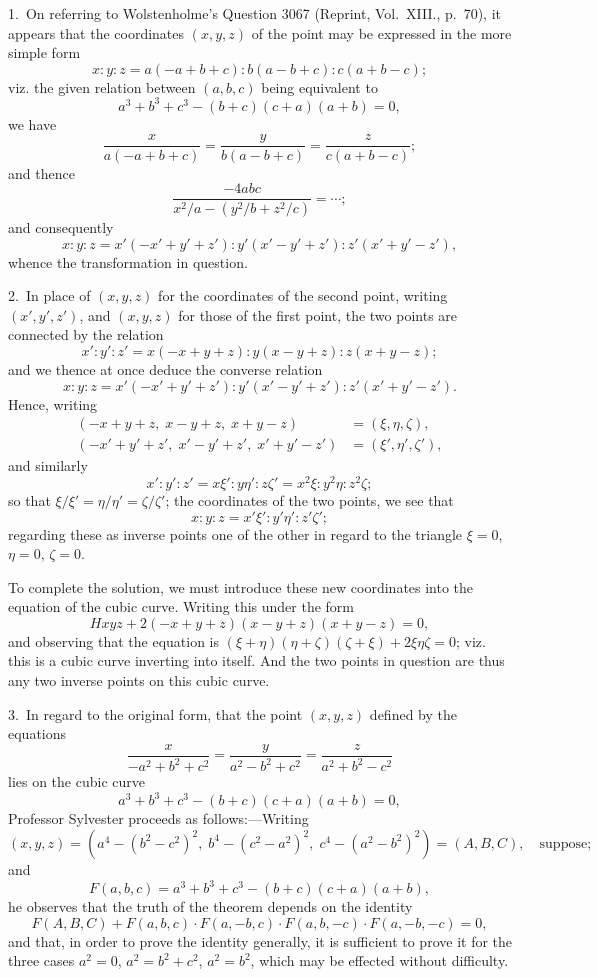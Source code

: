 \documentclass[11pt,a4paper]{book}
\begin{document}
\begin{solution}
1.~On referring to Wolstenholme's Question 3067 (Reprint, Vol.~XIII., p.~70), it appears that the coordinates $(x,y,z)$ of the point may be expressed in the more simple form
\[
x : y : z = a(-a+b+c) : b(a-b+c) : c(a+b-c);
\]
viz. the given relation between $(a,b,c)$ being equivalent to
\[
a^3 + b^3 + c^3 - (b+c)(c+a)(a+b) = 0,
\]
we have
\[
\frac{x}{a(-a+b+c)} = \frac{y}{b(a-b+c)} = \frac{z}{c(a+b-c)};
\]
and thence
\[
\frac{-4abc}{x^2/a - (y^2/b + z^2/c)} = \cdots;
\]
and consequently
\[
x : y : z = x'(-x'+y'+z') : y'(x'-y'+z') : z'(x'+y'-z'),
\]
whence the transformation in question.

2.~In place of $(x,y,z)$ for the coordinates of the second point, writing $(x',y',z')$, and $(x,y,z)$ for those of the first point, the two points are connected by the relation
\[
x' : y' : z' = x(-x+y+z) : y(x-y+z) : z(x+y-z);
\]
and we thence at once deduce the converse relation
\[
x : y : z = x'(-x'+y'+z') : y'(x'-y'+z') : z'(x'+y'-z').
\]
Hence, writing
\[
\begin{aligned}
(-x+y+z, \; x-y+z, \; x+y-z) &= (\xi, \eta, \zeta), \\
(-x'+y'+z', \; x'-y'+z', \; x'+y'-z') &= (\xi', \eta', \zeta'),
\end{aligned}
\]
and similarly
\[
x' : y' : z' = x\xi' : y\eta' : z\zeta' = x^2\xi : y^2\eta : z^2\zeta;
\]
so that $\xi/\xi' = \eta/\eta' = \zeta/\zeta'$; the coordinates of the two points, we see that
\[
x : y : z = x'\xi' : y'\eta' : z'\zeta';
\]
regarding these as inverse points one of the other in regard to the triangle $\xi=0$, $\eta=0$, $\zeta=0$.

To complete the solution, we must introduce these new coordinates into the equation of the cubic curve. Writing this under the form
\[
Hxyz + 2(-x+y+z)(x-y+z)(x+y-z) = 0,
\]
and observing that the equation is $(\xi+\eta)(\eta+\zeta)(\zeta+\xi) + 2\xi\eta\zeta = 0$; viz. this is a cubic curve inverting into itself. And the two points in question are thus any two inverse points on this cubic curve.

3.~In regard to the original form, that the point $(x,y,z)$ defined by the equations
\[
\frac{x}{-a^2+b^2+c^2} = \frac{y}{a^2-b^2+c^2} = \frac{z}{a^2+b^2-c^2}
\]
lies on the cubic curve
\[
a^3+b^3+c^3-(b+c)(c+a)(a+b)=0,
\]
Professor Sylvester proceeds as follows:---Writing
\[
(x,y,z) = (a^4-(b^2-c^2)^2, \; b^4-(c^2-a^2)^2, \; c^4-(a^2-b^2)^2) = (A,B,C), \quad\text{suppose;}
\]
and
\[
F(a,b,c) = a^3+b^3+c^3-(b+c)(c+a)(a+b),
\]
he observes that the truth of the theorem depends on the identity
\[
F(A,B,C) + F(a,b,c) \cdot F(a,-b,c) \cdot F(a,b,-c) \cdot F(a,-b,-c) = 0,
\]
and that, in order to prove the identity generally, it is sufficient to prove it for the three cases $a^2=0$, $a^2=b^2+c^2$, $a^2=b^2$, which may be effected without difficulty.


\end{solution}
\end{document}
